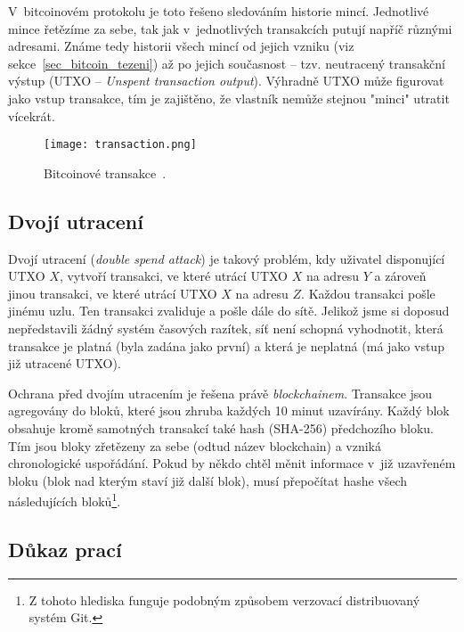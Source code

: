 V~bitcoinovém protokolu je toto řešeno sledováním historie mincí. Jednotlivé mince řetězíme za sebe, tak jak v~jednotlivých transakcích putují napříč různými adresami. Známe tedy historii všech mincí od jejich vzniku (viz sekce~\ref{sec_bitcoin_tezeni}) až po jejich současnost -- tzv. neutracený transakční výstup (UTXO -- \textit{Unspent transaction output}). Výhradně UTXO může figurovat jako vstup transakce, tím je zajištěno, že vlastník nemůže stejnou "minci" utratit vícekrát.

\begin{figure}[ht]
    \centering
    \texttt{[image: transaction.png]}
    \caption{Bitcoinové transakce~\cite{bib_white_paper}.}
    \label{fig_transaction}
\end{figure}


\subsection{Dvojí utracení}
\label{sec_bitcoin_dvoji_utraceni}

Dvojí utracení (\textit{double spend attack}) je takový problém, kdy uživatel disponující UTXO $X$, vytvoří transakci, ve které utrácí UTXO $X$ na adresu $Y$ a zároveň jinou transakci, ve které utrácí UTXO $X$ na adresu $Z$. Každou transakci pošle jinému uzlu. Ten transakci zvaliduje a pošle dále do sítě. Jelikož jsme si doposud nepředstavili žádný systém časových razítek, síť není schopná vyhodnotit, která transakce je platná (byla zadána jako první) a která je neplatná (má jako vstup již utracené UTXO).

Ochrana před dvojím utracením je řešena právě \textit{blockchainem}. Transakce jsou agregovány do bloků, které jsou zhruba každých 10 minut uzavírány. Každý blok obsahuje kromě samotných transakcí také hash (SHA-256) předchozího bloku. Tím jsou bloky zřetězeny za sebe (odtud název blockchain) a vzniká chronologické uspořádání. Pokud by někdo chtěl měnit informace v~již uzavřeném bloku (blok nad kterým staví již další blok), musí přepočítat hashe všech následujících bloků\footnote{Z tohoto hlediska funguje podobným způsobem verzovací distribuovaný systém Git.}.


\subsection{Důkaz prací}
\label{sec_bitcoin_dukaz_praci}

